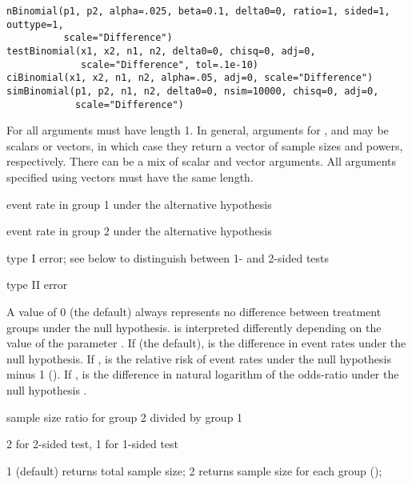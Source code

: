 \begin{Usage}
\begin{verbatim}
nBinomial(p1, p2, alpha=.025, beta=0.1, delta0=0, ratio=1, sided=1, outtype=1,
          scale="Difference") 
testBinomial(x1, x2, n1, n2, delta0=0, chisq=0, adj=0,
             scale="Difference", tol=.1e-10)
ciBinomial(x1, x2, n1, n2, alpha=.05, adj=0, scale="Difference")
simBinomial(p1, p2, n1, n2, delta0=0, nsim=10000, chisq=0, adj=0,
            scale="Difference")
\end{verbatim}
\end{Usage}
\begin{Arguments}
For  all arguments must have length 1.
In general, arguments for ,  and  may be scalars or vectors, 
in which case they return a vector of sample sizes and powers, respectively.
There can be a mix of scalar and vector arguments. 
All arguments specified using vectors must have the same length.  

\begin{ldescription}
\item[\code{p1}] event rate in group 1 under the alternative hypothesis
\item[\code{p2}] event rate in group 2 under the alternative hypothesis
\item[\code{alpha}] type I error; see  below to distinguish between 1- and 2-sided tests
\item[\code{beta}] type II error
\item[\code{delta0}] A value of 0 (the default) always represents no difference between treatment groups under the null hypothesis.
 is interpreted differently depending on the value of the parameter . 
If  (the default), 
 is the difference in event rates under the null hypothesis.
If , 
 is the relative risk of event rates under the null hypothesis minus 1 ().
If , 
 is the difference in natural logarithm of the odds-ratio under the null hypothesis
.

\item[\code{ratio}] sample size ratio for group 2 divided by group 1
\item[\code{sided}] 2 for 2-sided test, 1 for 1-sided test
\item[\code{outtype}] 1 (default) returns total sample size; 2 returns sample size for each group (); 


\end{ldescription}
\end{Arguments}
